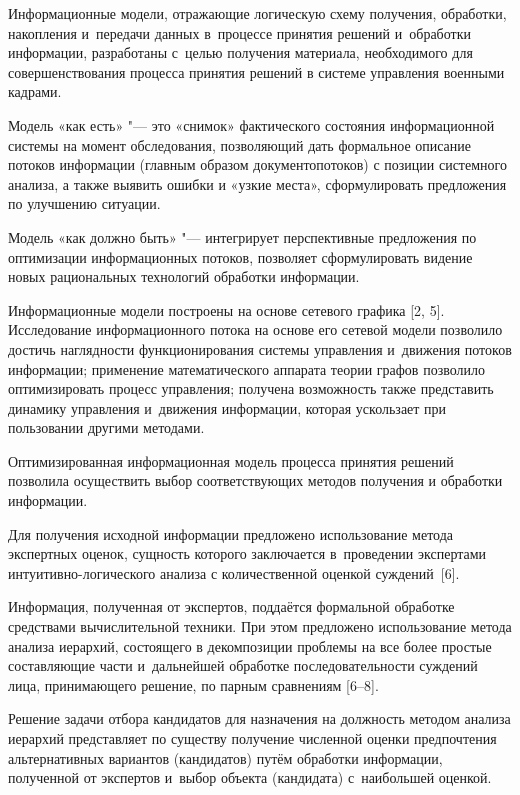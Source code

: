 Информационные модели, отражающие логическую схему получения, обработки, накопления и~передачи данных в~процессе принятия решений и~обработки информации, разработаны с~целью получения материала, необходимого для совершенствования процесса принятия решений в системе управления военными кадрами.



Модель «как есть» "--- это «снимок» фактического состояния информационной системы на момент обследования, позволяющий дать формальное описание потоков информации (главным образом документопотоков) с позиции системного анализа, а также выявить ошибки и «узкие места», сформулировать предложения по улучшению ситуации.



Модель «как должно быть» "--- интегрирует перспективные предложения по оптимизации информационных потоков, позволяет сформулировать видение новых рациональных технологий обработки информации.



Информационные модели построены на основе сетевого графика [2, 5]. Исследование информационного потока на основе его сетевой модели позволило достичь наглядности функционирования системы управления и~движения потоков информации; применение математического аппарата теории графов позволило оптимизировать процесс управления; получена возможность также представить динамику управления и~движения информации, которая ускользает при пользовании другими методами.



Оптимизированная информационная модель процесса принятия решений позволила осуществить выбор соответствующих методов получения и обработки информации.



Для получения исходной информации предложено использование метода экспертных оценок, сущность которого заключается в~проведении экспертами интуитивно-логического анализа с количественной оценкой суждений~[6].



Информация, полученная от экспертов, поддаётся формальной обработке средствами вычислительной техники. При этом предложено использование метода анализа иерархий, состоящего в декомпозиции проблемы на все более простые составляющие части и~дальнейшей обработке последовательности суждений лица, принимающего решение, по парным сравнениям [6--8].



Решение задачи отбора кандидатов для назначения на должность методом анализа иерархий представляет по существу получение численной оценки предпочтения альтернативных вариантов (кандидатов) путём обработки информации, полученной от экспертов и~выбор объекта (кандидата) с~наибольшей оценкой.



